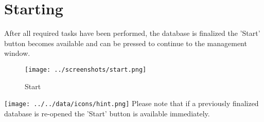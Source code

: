 \section{Starting}
\label{sec:startup_starting}

After all required tasks have been performed, the database is finalized the 'Start' button becomes available and can be pressed to continue to the management window. \\

\begin{figure}[H]
  \hspace*{-2.5cm}
    \texttt{[image: ../screenshots/start.png]}
  \caption{Start}
\end{figure}

\texttt{[image: ../../data/icons/hint.png]} Please note that if a previously finalized database is re-opened the 'Start' button is available immediately.


